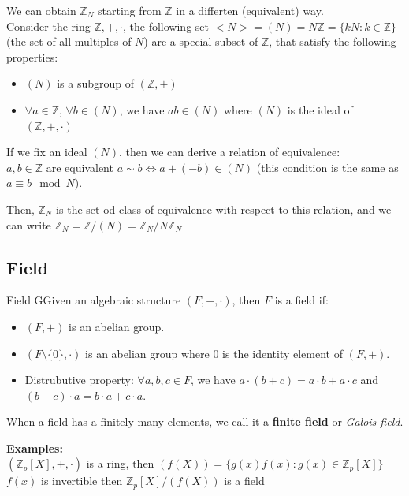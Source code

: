 \noindent
We can obtain $\mathbb{Z}_N$ starting from $\mathbb{Z}$ in a differten (equivalent) way.\\
Consider the ring $\mathbb{Z}, +, \cdot$, the following set $<N> = (N) = N\mathbb{Z} = \{ kN: k \in \mathbb{Z} \} $ (the set of all multiples of $N$) are a special subset of $\mathbb{Z}$, that satisfy the following properties:

\begin{itemize}
    \item $(N)$ is a subgroup of $(\mathbb{Z}, +)$
    \item $\forall a \in \mathbb{Z}$, $\forall b \in (N)$, we have $ab \in (N)$ where $(N)$ is the ideal of $(\mathbb{Z}, +, \cdot)$
\end{itemize}  
\smallskip

\noindent
If we fix an ideal $(N)$, then we can derive a relation of equivalence:\\
$a, b \in \mathbb{Z}$ are equivalent $a \sim b \iff a + (-b) \in (N)$ (this condition is the same as $a \equiv b \mod N$).
\medskip

\noindent
Then, $\mathbb{Z}_N$ is the set od class of equivalence with respect to this relation, and we can write $\mathbb{Z}_N = \mathbb{Z} / (N) = \mathbb{Z}_N / N\mathbb{Z}_N$

\newpage

\subsection{Field}
\begin{defBox}{Field}
    GGiven an algebraic structure $(F, +, \cdot)$, then $F$ is a field if:
    \begin{itemize}
        \item $(F, +)$ is an abelian group.
        \item $(F \setminus \{0\}, \cdot)$ is an abelian group where $0$ is the identity element of $(F, +)$.
        \item Distrubutive property: $\forall a, b, c \in F$, we have $a \cdot (b + c) = a \cdot b + a \cdot c$ and $(b + c) \cdot a = b \cdot a + c \cdot a$.
    \end{itemize}
\end{defBox}

\noindent
When a field has a finitely many elements, we call it a \textbf{finite field} or \textit{Galois field}.\\
\medskip

\noindent
\textbf{Examples:}\\
$(\mathbb{Z}_p[X], +, \cdot)$ is a ring, then $(f(X))= \{ g(x)f(x): g(x) \in \mathbb{Z}_p[X] \}$\\
$f(x)$ is invertible then $\mathbb{Z}_p[X] / (f(X))$ is a field

